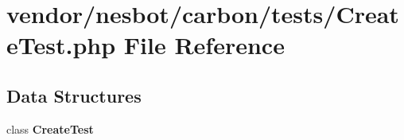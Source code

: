 \section{vendor/nesbot/carbon/tests/\+Create\+Test.php File Reference}
\label{nesbot_2carbon_2tests_2_create_test_8php}
\subsection*{Data Structures}
\begin{DoxyCompactItemize}
\item 
class {\bf Create\+Test}
\end{DoxyCompactItemize}
